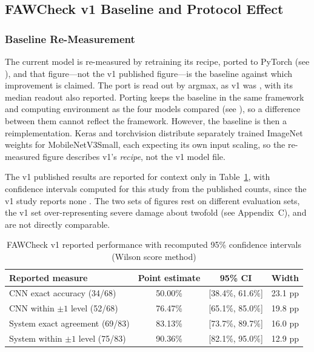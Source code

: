 \documentclass{icsthesis}
\newcommand{\secref}[1]{\textit{\nameref{#1}}}
\begin{document}
\begin{mainmatter}
			\subsection{FAWCheck v1 Baseline and Protocol Effect}\label{sec:v1comp}

				\subsubsection{Baseline Re-Measurement}\label{sec:baseline}

					The current model is re-measured by retraining its recipe, ported to PyTorch
					(see \secref{sec:recipe}), and that figure---not the v1 published figure---is
					the baseline against which improvement is claimed. The port is read out by
					argmax, as v1 was \citep{casasola2026}, with its median readout also reported.
					Porting keeps the baseline in the same framework and computing environment as
					the four models compared (see \secref{sec:materials}), so a difference between
					them cannot reflect the framework. However, the baseline is then a
					reimplementation. Keras and torchvision distribute separately trained ImageNet
					weights for MobileNetV3Small, each expecting its own input scaling, so the
					re-measured figure describes v1's \textit{recipe}, not the v1 model file.

					The v1 published results are reported for context only in
					Table~\ref{tab:v1perf}, with confidence intervals computed for this study from
					the published counts, since the v1 study reports none \citep{casasola2026}. The two sets of figures rest on different evaluation sets, the v1 set over-representing severe damage about twofold (see Appendix~C), and are not directly comparable.

					\begin{table}[htbp]
					\vspace{4ex}
					\centering
						\caption{FAWCheck v1 reported performance with recomputed 95\% confidence
						intervals (Wilson score method)}
						\label{tab:v1perf}
						\begin{tabular}{lccc}
						\hline
						\hline
						Reported measure & Point estimate & 95\% CI & Width \\ \hline
						CNN exact accuracy (34/68) & 50.00\% & [38.4\%, 61.6\%] & 23.1 pp \\
						CNN within $\pm 1$ level (52/68) & 76.47\% & [65.1\%, 85.0\%] & 19.8 pp \\
						System exact agreement (69/83) & 83.13\% & [73.7\%, 89.7\%] & 16.0 pp \\
						System within $\pm 1$ level (75/83) & 90.36\% & [82.1\%, 95.0\%] & 12.9 pp
						\\ \hline\hline
						\end{tabular}
					\vspace{4ex}
					\end{table}


\end{mainmatter}
\end{document}
